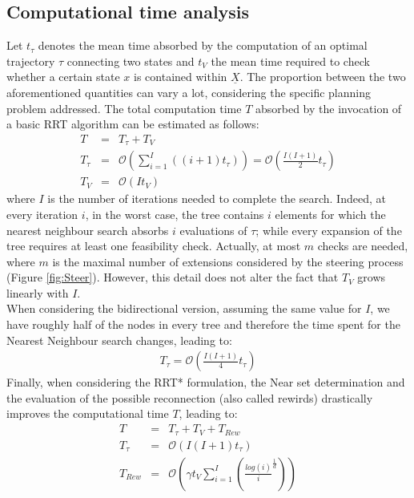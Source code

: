 \subsection{Computational time analysis} \label{Sec:cmpt_time_serial}

Let $t_{\tau}$ denotes the mean time absorbed by the computation of an optimal trajectory $\tau$ connecting two states and $t_{V}$ the mean time required to check whether a certain state $x$ is contained within $\underline{X}$. The proportion between the two aforementioned quantities can vary a lot, considering the specific planning problem addressed.  
The total computation time $T$ absorbed by the invocation of a basic RRT algorithm can be estimated as follows:
\begin{eqnarray}
T &=& T_{\tau} + T_V \nonumber\\
T_{\tau} & = & \mathcal{O} \left( \sum_{i=1}^I ((i+1)t_{\tau}) \right) = \mathcal{O} \left( \frac{I(I+1)}{2} t_{\tau} \right) \nonumber\\
T_{V} & = & \mathcal{O} \left( I t_V \right) 
\label{eq:T_serial_single}
\end{eqnarray}
where $I$ is the number of iterations needed to complete the search. 
Indeed, at every iteration $i$, in the worst case, the tree contains $i$ elements for which the nearest neighbour search absorbs $i$ evaluations of $\tau$; while every expansion of the tree requires at least one feasibility check. Actually, at most $m$ checks are needed, where $m$ is the maximal number of extensions considered by the steering process (Figure \ref{fig:Steer}). However, this detail does not alter the fact that $T_V$ grows linearly with $I$. 
\\
When considering the bidirectional version, assuming the same value for $I$, we have roughly half of the nodes in every tree and therefore the time spent for the Nearest Neighbour search changes, leading to:
\begin{eqnarray}
T_{\tau} = \mathcal{O} \left( \frac{I(I+1)}{4} t_{\tau} \right)
\label{eq:T_serial_bid}
\end{eqnarray}
Finally, when considering the RRT* formulation, the Near set determination and the evaluation of the possible reconnection (also called rewirds) drastically improves the computational time $T$, leading to:
\begin{eqnarray}
T &=& T_{\tau} + T_V \nonumber + T_{Rew}\\
T_{\tau} &= & \mathcal{O} \left(  I(I+1) t_{\tau} \right) \nonumber\\ 
T_{Rew} &= & \mathcal{O} \left( \gamma t_V \sum_{i=1}^I \left( \frac{log(i)}{i}^{\frac{1}{d}} \right)  \right)
  \label{eq:T_serial_star}
\end{eqnarray}

